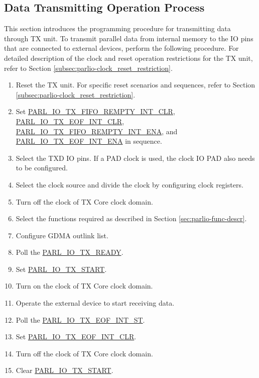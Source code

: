 \documentclass[main\_\_EN.tex]{subfiles}
\begin{document}
\subsection{Data Transmitting Operation Process}
This section introduces the programming procedure for transmitting data through TX unit. To transmit parallel data from internal memory to the IO pins that are connected to external devices, perform the following procedure. For detailed description of the clock and reset operation restrictions for the TX unit, refer to Section \ref{subsec:parlio-clock_reset_restriction}.
\begin{enumerate}
    \item Reset the TX unit. For specific reset scenarios and sequences, refer to Section \ref{subsec:parlio-clock_reset_restriction}.
    \item Set \hyperref[fielddesc:PARLIOTXFIFOREMPTYINTCLR]{PARL\_IO\_TX\_FIFO\_REMPTY\_INT\_CLR}, \hyperref[fielddesc:PARLIOTXEOFINTCLR]{PARL\_IO\_TX\_EOF\_INT\_CLR}, \hyperref[fielddesc:PARLIOTXFIFOREMPTYINTENA]{PARL\_IO\_TX\_FIFO\_REMPTY\_INT\_ENA}, and \hyperref[fielddesc:PARLIOTXEOFINTENA]{PARL\_IO\_TX\_EOF\_INT\_ENA} in sequence.
    \item Select the TXD IO pins. If a PAD clock is used, the clock IO PAD also needs to be configured.
    \item Select the clock source and  divide the clock by configuring clock registers.
    \item Turn off the clock of TX Core clock domain.
    \item Select the functions required as described in Section \ref{sec:parlio-func-descr}.
    \item Configure GDMA outlink list.
    \item Poll the \hyperref[fielddesc:PARLIOTXREADY]{PARL\_IO\_TX\_READY}.
    \item Set \hyperref[fielddesc:PARLIOTXSTART]{PARL\_IO\_TX\_START}.
    \item Turn on the clock of TX Core clock domain.
    \item Operate the external device to start receiving data.
    \item Poll the \hyperref[fielddesc:PARLIOTXEOFINTST]{PARL\_IO\_TX\_EOF\_INT\_ST}.
    \item Set \hyperref[fielddesc:PARLIOTXEOFINTCLR]{PARL\_IO\_TX\_EOF\_INT\_CLR}.
    \item Turn off the clock of TX Core clock domain.
    \item Clear \hyperref[fielddesc:PARLIOTXSTART]{PARL\_IO\_TX\_START}.
\end{enumerate}
\end{document}
